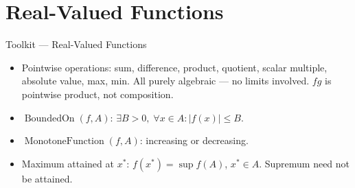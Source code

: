\section{Real-Valued Functions}

\begin{toolkitbox}{Toolkit --- Real-Valued Functions}
\begin{itemize}
  \item Pointwise operations: sum, difference, product, quotient,
    scalar multiple, absolute value, max, min. All purely algebraic
    --- no limits involved. $fg$ is pointwise product, not composition.
  \item $\operatorname{BoundedOn}(f,A)$: $\exists B>0,\;\forall x\in A:
    |f(x)|\leq B$.
  \item $\operatorname{MonotoneFunction}(f,A)$: increasing or decreasing.
  \item Maximum attained at $x^*$: $f(x^*) = \sup f(A)$, $x^*\in A$.
    Supremum need not be attained.
\end{itemize}
\end{toolkitbox}


